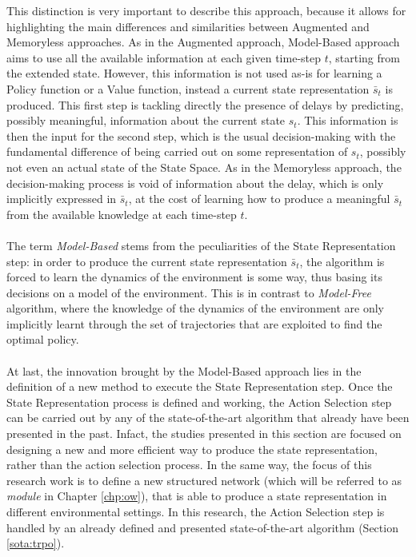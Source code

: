                 This distinction is very important to describe this approach, because it allows for highlighting the main differences and similarities between Augmented and Memoryless approaches. As in the Augmented approach, Model-Based approach aims to use all the available information at each given time-step $t$, starting from the extended state. However, this information is not used as-is for learning a Policy function or a Value function, instead a current state representation $\bar{s}_t$ is produced. This first step is tackling directly the presence of delays by predicting, possibly meaningful, information about the current state $s_t$. This information is then the input for the second step, which is the usual decision-making with the fundamental difference of being carried out on some representation of $s_t$, possibly not even an actual state of the State Space. As in the Memoryless approach, the decision-making process is void of information about the delay, which is only implicitly expressed in $\bar{s}_t$, at the cost of learning how to produce a meaningful $\bar{s}_t$ from the available knowledge at each time-step $t$.
                \\\\
                The term \textit{Model-Based} stems from the peculiarities of the State Representation step: in order to produce the current state representation $\bar{s}_t$, the algorithm is forced to learn the dynamics of the environment is some way, thus basing its decisions on a model of the environment. This is in contrast to \textit{Model-Free} algorithm, where the knowledge of the dynamics of the environment are only implicitly learnt through the set of trajectories that are exploited to find the optimal policy.
                \\\\
                At last, the innovation brought by the Model-Based approach lies in the definition of a new method to execute the State Representation step. Once the State Representation process is defined and working, the Action Selection step can be carried out by any of the state-of-the-art algorithm that already have been presented in the past. Infact, the studies presented in this section are focused on designing a new and more efficient way to produce the state representation, rather than the action selection process. In the same way, the focus of this research work is to define a new structured network (which will be referred to as \textit{module} in Chapter \ref{chp:ow}), that is able to produce a state representation in different environmental settings. In this research, the Action Selection step is handled by an already defined and presented state-of-the-art algorithm (Section \ref{sota:trpo}).
                
